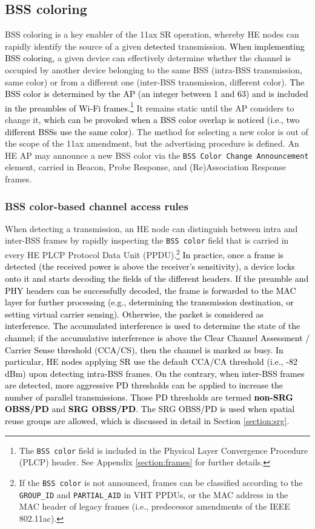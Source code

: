 \documentclass[preprint,12pt]{elsarticle}
\begin{document}
\subsection{BSS coloring}	
\label{section:bss_coloring}	
BSS coloring is a key enabler of the 11ax SR operation, whereby HE nodes can rapidly identify the source of a given \textcolor{black}{detected} transmission. \textcolor{black}{When implementing BSS coloring,} a given device can effectively determine whether the channel is occupied by another device belonging to the same BSS (intra-BSS transmission, same color) or from a different one (inter-BSS transmission, different color). \textcolor{black}{The BSS color is determined by the AP (an integer between 1 and 63) and is included in the preambles of Wi-Fi frames.}\footnote{The \texttt{BSS color} field is included in the Physical Layer Convergence Procedure (PLCP) header. See Appendix \ref{section:frames} for further details.} It remains static until the AP considers to change it\textcolor{black}{, which can be provoked when a BSS color overlap is noticed (i.e., two different BSSs use the same color).} The method for selecting a new color is out of the scope of the 11ax amendment, but the advertising procedure is defined. An HE AP may announce a new BSS color via the \texttt{BSS Color Change Announcement} element, carried in Beacon, Probe Response, and (Re)Association Response frames. 

\subsubsection{BSS color-based channel access rules}
\label{section:bss_color_channel_access}
When detecting a transmission, an HE node can distinguish between intra and inter-BSS frames by rapidly inspecting the \texttt{BSS color} field that is carried in every HE PLCP Protocol Data Unit (PPDU).\footnote{If the \texttt{BSS color} is not announced, frames can be classified according to the \texttt{GROUP\_ID} and \texttt{PARTIAL\_AID} in VHT PPDUs, or the MAC address in the MAC header of legacy frames (i.e., predecessor amendments of the IEEE 802.11ac).} \textcolor{black}{In practice, once a frame is detected (the received power is above the receiver's sensitivity), a device locks onto it and starts decoding the fields of the different headers. If the preamble and PHY headers can be successfully decoded, the frame is forwarded to the MAC layer for further processing (e.g., determining the transmission destination, or setting virtual carrier sensing). Otherwise, the packet is considered as interference. The accumulated interference is used to determine the state of the channel; if the accumulative interference is above the Clear Channel Assessment / Carrier Sense threshold (CCA/CS), then the channel is marked as busy. In particular, HE nodes applying SR use the default CCA/CA threshold (i.e., -82 dBm) upon detecting intra-BSS frames. On the contrary, when inter-BSS frames are detected, more aggressive PD thresholds can be applied to increase the number of parallel transmissions. Those PD thresholds are termed \textbf{non-SRG OBSS/PD} and \textbf{SRG OBSS/PD}. The SRG OBSS/PD is used when spatial reuse groups are allowed, which is discussed in detail in Section \ref{section:srg}.}
\end{document}
